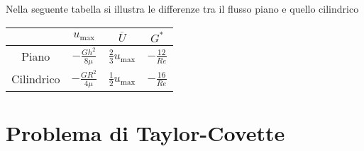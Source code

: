 Nella seguente tabella si illustra le differenze tra il flusso piano e quello cilindrico
\begin{table}[H]
  \centering
  \Large
  \begin{tabular}[H]{c|c|c|c}
    & $ u_\text{max}  $ & $ \overline{U} $ & $ G^* $\\ \hline
    Piano & $ -\frac{Gh^2}{8\mu } $ & $ \frac{2}{3}u_\text{max}  $ & $-\frac{12}{Re}$\\
    Cilindrico & $ -\frac{GR^2}{4\mu } $ & $ \frac{1}{2}u_\text{max}  $ & $-\frac{16}{Re}$\\
                                              
  \end{tabular}
\end{table}

\section{Problema di Taylor-Covette}
\begin{figure}[H]
  \centering
\end{figure}

